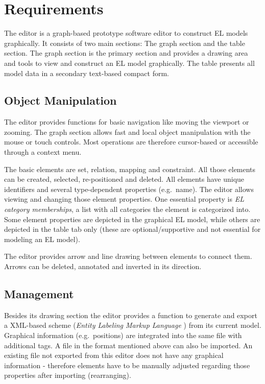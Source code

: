 \documentclass[twoside, openright, 12pt]{book}
\begin{document}
\section{Requirements}
\label{editor_requirements}
The editor is a graph-based prototype software editor to construct EL models graphically.
It consists of two main sections: The graph section and the table section.
The graph section is the primary section and provides a drawing area and tools to view and construct an EL model graphically.
The table presents all model data in a secondary text-based compact form.



\subsection{Object Manipulation}
\label{req_object_manipulation}
The editor provides functions for basic navigation like moving the viewport or zooming.
The graph section allows fast and local object manipulation with the mouse or touch controls.
Most operations are therefore cursor-based or accessible through a context menu.

The basic elements are set, relation, mapping and constraint.
All those elements can be created, selected, re-positioned and deleted.
All elements have unique identifiers and several type-dependent properties (e.g.\ name).
The editor allows viewing and changing those element properties.
One essential property is \textit{EL category memberships}, a list with all categories the element is categorized into.
Some element properties are depicted in the graphical EL model, while others are depicted in the table tab only (these are optional/supportive and not essential for modeling an EL model).

The editor provides arrow and line drawing between elements to connect them.
Arrows can be deleted, annotated and inverted in its direction.



\subsection{Management}
\label{req_management}
Besides its drawing section the editor provides a function to generate and export a XML-based scheme (\textit{Entity Labeling Markup Language} \citep{Amthor18}) from its current model.
Graphical information (e.g.\ positions) are integrated into the same file with additional tags.
A file in the format mentioned above can also be imported.
An existing file not exported from this editor does not have any graphical information - therefore elements have to be manually adjusted regarding those properties after importing (rearranging).
\end{document}
